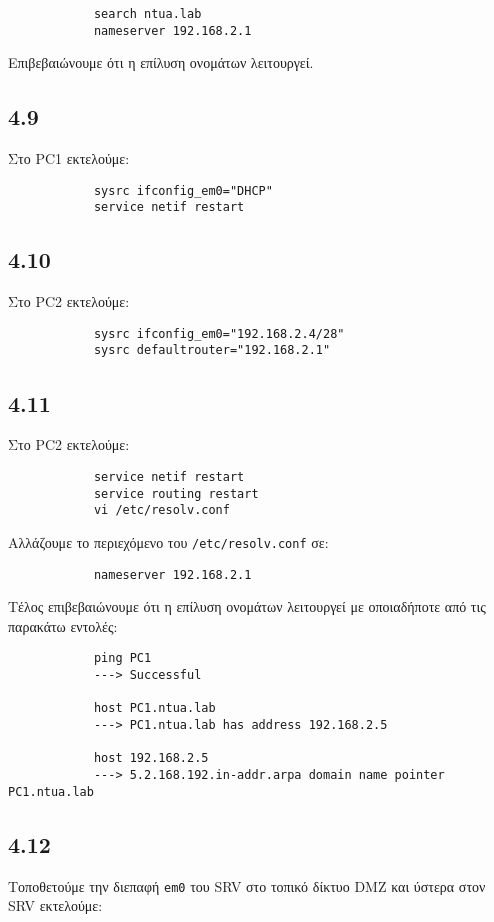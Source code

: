 \documentclass[a4paper, 12pt]{article}
\begin{document}
		\begin{verbatim}
			search ntua.lab
			nameserver 192.168.2.1
		\end{verbatim}
		
		Επιβεβαιώνουμε ότι η επίλυση ονομάτων λειτουργεί.

	\subsection*{4.9}
		Στο PC1 εκτελούμε:
		
		\begin{verbatim}
			sysrc ifconfig_em0="DHCP"
			service netif restart
		\end{verbatim} 

	\subsection*{4.10}
		Στο PC2 εκτελούμε:
		
		\begin{verbatim}
			sysrc ifconfig_em0="192.168.2.4/28"
			sysrc defaultrouter="192.168.2.1"
		\end{verbatim}

	\subsection*{4.11}
		Στο PC2 εκτελούμε:
		
		\begin{verbatim}
			service netif restart
			service routing restart
			vi /etc/resolv.conf
		\end{verbatim}
		
		Αλλάζουμε το περιεχόμενο του \verb|/etc/resolv.conf| σε:
		
		\begin{verbatim}
			nameserver 192.168.2.1
		\end{verbatim}
		
		Τέλος επιβεβαιώνουμε ότι η επίλυση ονομάτων λειτουργεί με οποιαδήποτε από τις παρακάτω εντολές:
		
		\begin{verbatim}
			ping PC1     
			---> Successful
			
			host PC1.ntua.lab 
			---> PC1.ntua.lab has address 192.168.2.5
			
			host 192.168.2.5
			---> 5.2.168.192.in-addr.arpa domain name pointer PC1.ntua.lab
		\end{verbatim}

	\subsection*{4.12}
		Τοποθετούμε την διεπαφή \verb|em0| του SRV στο τοπικό δίκτυο DMZ και ύστερα στον SRV εκτελούμε:
		
\end{document}
